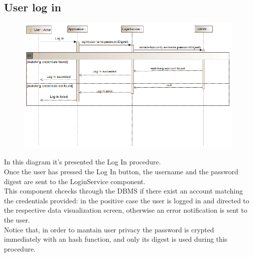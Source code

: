 \subsection{User log in}
\begin{figure}[H]
\centering
\includegraphics[width=\linewidth]{resources/uml/sequence/LogIn.png}
\end{figure}
In this diagram it's presented the Log In procedure.\\
Once the user has pressed the Log In button, the username and the password digest are sent to the LoginService component.\\
This component chcecks through the DBMS if there exist an account matching the credentials provided: in the positive case the user is logged in and directed to the respective data visualization screen, otherwise an error notification is sent to the user.\\
Notice that, in order to mantain user privacy the password is crypted immediately with an hash function, and only its digest is used during this procedure.


